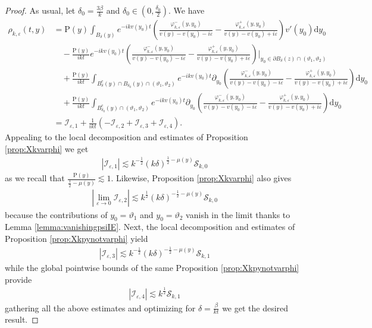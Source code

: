 \documentclass[11pt,reqno]{amsproc}
\theoremstyle{definition}
\numberwithin{equation}{section}
\newcommand{\cI}{{\mathcal I}}
\newcommand{\cS}{{\mathcal S}}
\renewcommand{\d}{\mathrm{d}}
\newcommand{\ep}{\varepsilon}
\begin{document}
\begin{proof}
As usual, let $\delta_0=\frac{3\beta}{k}$ and $\delta_0\in (0,\frac{\delta_0}{2})$. We have
\begin{align*}
\rho_{k,\ep}(t,y) &= \mathrm{P}(y)\int_{B_\delta(y)}e^{-ikv(y_0)t}\left( \frac{\varphi_{k,\ep}^-(y,y_0)}{v(y) - v(y_0) - i\ep} - \frac{\varphi_{k,\ep}^+(y,y_0)}{v(y) - v(y_0) + i\ep} \right) v'(y_0) \d y_0 \\
&\quad -\frac{\mathrm{P}(y)}{ikt} {e^{-ikv(y_0)t}}\left( \frac{\varphi_{k,\ep}^-(y,y_0)}{v(y) - v(y_0) - i\ep} - \frac{\varphi_{k,\ep}^+(y,y_0)}{v(y) - v(y_0) + i\ep} \right) \Big|_{y_0\in \partial B_\delta(z) \cap (\vartheta_1,\vartheta_2)} \\
&\quad + \frac{\mathrm{P}(y)}{ikt}\int_{B_\delta^c(y)\cap B_{\delta_0}(y) \cap (\vartheta_1,\vartheta_2)}{e^{-ikv(y_0)t}}  \partial_{y_0} \left(  \frac{\varphi_{k,\ep}^-(y,y_0)}{v(y) - v(y_0) - i\ep} - \frac{\varphi_{k,\ep}^+(y,y_0)}{v(y) - v(y_0) + i\ep}\right) \d y_0 \\
&\quad + \frac{\mathrm{P}(y)}{ikt}\int_{B_{\delta_0}^c(y) \cap (\vartheta_1,\vartheta_2)}{e^{-ikv(y_0)t}}  \partial_{y_0} \left(  \frac{\varphi_{k,\ep}^-(y,y_0)}{v(y) - v(y_0) - i\ep} - \frac{\varphi_{k,\ep}^+(y,y_0)}{v(y) - v(y_0) + i\ep} \right) \d y_0  \\
&= \cI_{\ep,1} + \frac{1}{ikt}\left( -\cI_{\ep,2} + \cI_{\ep,3} + \cI_{\ep,4} \right).
\end{align*}
Appealing to the local decomposition and estimates of Proposition \ref{prop:Xkvarphi} we get
\begin{align*}
\left| \cI_{\ep,1} \right| \lesssim k^{-\frac12} (k\delta)^{\frac12-\mu(y)}\cS_{k,0}
\end{align*}
as we recall that $\frac{\mathrm{P}(y)}{\frac12-\mu(y)}\lesssim 1$. Likewise, Proposition \ref{prop:Xkvarphi} also gives
\begin{align*}
\left| \lim_{\ep\rightarrow 0}\cI_{\ep,2} \right| \lesssim k^{\frac12} (k\delta)^{-\frac12-\mu(y)}\cS_{k,0}
\end{align*}
because the contributions of $y_0=\vartheta_1$ and $y_0=\vartheta_2$ vanish in the limit thanks to Lemma \ref{lemma:vanishingpsiIE}. Next, the local decomposition and estimates of Proposition \ref{prop:Xkpynotvarphi} yield
\begin{align*}
\left| \cI_{\ep,3} \right| \lesssim k^{-\frac12} (k\delta)^{-\frac12-\mu(y)}\cS_{k,1}
\end{align*}
while the global pointwise bounds of the same Proposition \ref{prop:Xkpynotvarphi} provide
\begin{align*}
\left| \cI_{\ep,4} \right| \lesssim k^{\frac12} \cS_{k,1}
\end{align*}
gathering all the above estimates and optimizing for $\delta= \frac{\beta}{kt}$ we get the desired result.
\end{proof}
\end{document}
